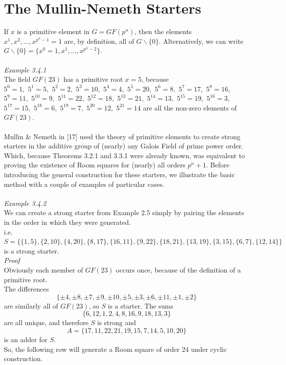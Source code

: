 \documentclass[
  12pt,
  a4paper]{book}
\begin{document}
\hypertarget{the-mullin-nemeth-starters}{%
\section{The Mullin-Nemeth Starters}\label{the-mullin-nemeth-starters}}

If \(x\) is a primitive element in \(G=GF(p^n)\), then the elements
\(x^1,x^2,...,x^{p^n-1}=1\) are, by definition, all of
\(G \backslash \{0\}\). Alternatively, we can write
\(G \backslash \{0\}=\{x^0=1,x^1,..., x^{p^n-2}\}\).\\
~\\
\emph{Example 3.4.1}\\
The field \(GF(23)\) has a primitive root \(x=5\), because\\
\(5^0=1,\) \(5^1=5,\) \(5^2=2,\) \(5^3=10,\) \(5^4=4,\) \(5^5=20,\)
\(5^6=8,\) \(5^7=17,\) \(5^8=16,\) \(5^9=11,\) \(5^{10}=9,\)
\(5^{11}=22,\) \(5^{12}=18,\) \(5^{13}=21,\) \(5^{14}=13,\)
\(5^{15}=19,\) \(5^{16}=3,\) \(5^{17}=15,\) \(5^{18}=6,\) \(5^{19}=7,\)
\(5^{20}=12,\) \(5^{21}=14\) are all the non-zero elements of
\(GF(23)\).\\
~\\
Mullin \& Nemeth in {[}17{]} used the theory of primitive elements to
create strong starters in the additive group of (nearly) any Galois
Field of prime power order. Which, because Theorems 3.2.1 and 3.3.1 were
already known, was equivalent to proving the existence of Room squares
for (nearly) all orders \(p^n+1\). Before introducing the general
construction for these starters, we illustrate the basic method with a
couple of examples of particular cases.\\
~\\
\emph{Example 3.4.2}\\
We can create a strong starter from Example 2.5 simply by pairing the
elements in the order in which they were generated.\\
i.e.
\(S=\{\{1,5\},\{2,10\},\{4,20\},\{8,17\},\{16,11\},\{9,22\},\{18,21\},\{13,19\},\{3,15\},\{6,7\},\{12,14\}\}\)\\
is a strong starter.\\
\emph{Proof}\\
Obviously each member of \(GF(23)\) occurs once, because of the
definition of a primitive root.\\
The differences
\[\{\pm 4, \pm 8, \pm 7, \pm 9, \pm 10, \pm 5, \pm 3, \pm 6, \pm 11, \pm 1, \pm 2\}\]
are similarly all of \(GF(23)\), so \(S\) is a starter. The sums
\[\{6,12,1,2,4,8,16,9,18,13,3\}\] are all unique, and therefore \(S\) is
strong and \[A=\{17,11,22,21,19,15,7,14,5,10,20\}\] is an adder for
\(S\).\\
So, the following row will generate a Room square of order 24 under
cyclic construction.
\end{document}
